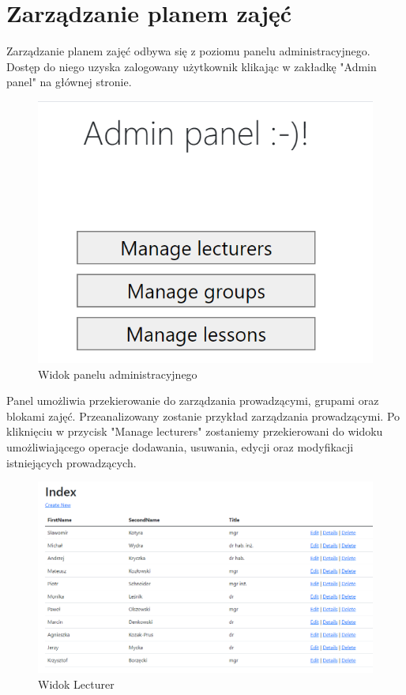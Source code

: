 \documentclass[]{article}
\begin{document}
\section{Zarządzanie planem zajęć}
Zarządzanie planem zajęć odbywa się z poziomu panelu administracyjnego. Dostęp do niego uzyska zalogowany użytkownik klikając w zakładkę "Admin panel" na głównej stronie.
\begin{figure}[H]
	\centering
	\includegraphics[scale=0.6]{admin-panel}
	\caption{Widok panelu administracyjnego}
\end{figure}
Panel umożliwia przekierowanie do zarządzania prowadzącymi, grupami oraz blokami zajęć. Przeanalizowany zostanie przykład zarządzania prowadzącymi. Po kliknięciu w przycisk "Manage lecturers" zostaniemy przekierowani do widoku umożliwiającego operacje dodawania, usuwania, edycji oraz modyfikacji istniejących prowadzących.
\begin{figure}[H]
	\centering
	\includegraphics[scale=0.5]{lecturers}
	\caption{Widok Lecturer}
\end{figure}
\end{document}
